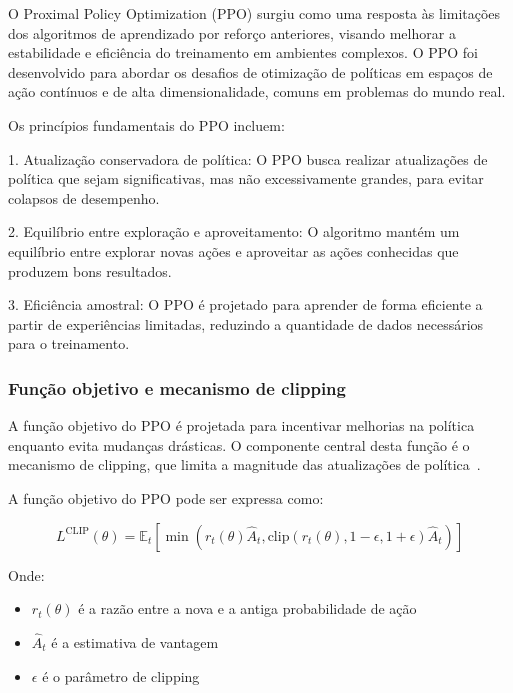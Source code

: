 O Proximal Policy Optimization (PPO) surgiu como uma resposta às limitações dos algoritmos de aprendizado por reforço anteriores, visando melhorar a estabilidade e eficiência do treinamento em ambientes complexos. O PPO foi desenvolvido para abordar os desafios de otimização de políticas em espaços de ação contínuos e de alta dimensionalidade, comuns em problemas do mundo real.

Os princípios fundamentais do PPO incluem:

1. Atualização conservadora de política: O PPO busca realizar atualizações de política que sejam significativas, mas não excessivamente grandes, para evitar colapsos de desempenho.

2. Equilíbrio entre exploração e aproveitamento: O algoritmo mantém um equilíbrio entre explorar novas ações e aproveitar as ações conhecidas que produzem bons resultados.

3. Eficiência amostral: O PPO é projetado para aprender de forma eficiente a partir de experiências limitadas, reduzindo a quantidade de dados necessários para o treinamento.

\subsubsection{Função objetivo e mecanismo de clipping}
\label{subsubsec:ppo_objetivo}

A função objetivo do PPO é projetada para incentivar melhorias na política enquanto evita mudanças drásticas. O componente central desta função é o mecanismo de clipping, que limita a magnitude das atualizações de política~\cite{Cheng2022AuthenticBoundary}.

A função objetivo do PPO pode ser expressa como:

\begin{equation}
L^{\text{CLIP}}(\theta) = \mathbb{E}_t[\min(r_t(\theta)\hat{A}_t, \text{clip}(r_t(\theta), 1-\epsilon, 1+\epsilon)\hat{A}_t)]
\end{equation}

Onde:

\begin{itemize}
    \item $r_t(\theta)$ é a razão entre a nova e a antiga probabilidade de ação
    \item $\hat{A}_t$ é a estimativa de vantagem
    \item $\epsilon$ é o parâmetro de clipping
\end{itemize}

